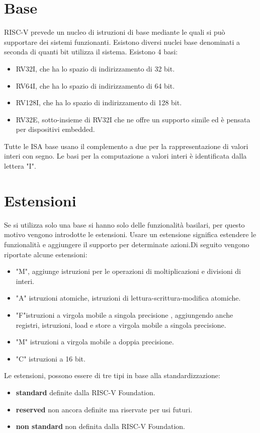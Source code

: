 \documentclass[12pt,a4paper]{report}
\begin{document}
\section{Base}
RISC-V prevede un nucleo di istruzioni di base mediante le quali si può supportare dei sistemi funzionanti. Esistono diversi nuclei base denominati a seconda di quanti bit utilizza il sistema.  Esistono 4 basi:
\begin{itemize}
	\item RV32I, che ha lo spazio di indirizzamento di 32 bit.  
	\item RV64I, che ha lo spazio di indirizzamento di 64 bit.
	\item RV128I, che ha lo spazio di indirizzamento di 128 bit.
	\item RV32E,  sotto-insieme di RV32I che ne offre un supporto simile ed è pensata  per dispositivi embedded.
\end{itemize}
Tutte le ISA base usano il complemento a due per la rappresentazione di valori interi con segno.  Le basi per la computazione a valori interi è identificata dalla lettera "I". 

\section{Estensioni}
Se si utilizza solo una base si hanno solo delle funzionalità basilari, per questo motivo vengono introdotte le estensioni. Usare un estensione significa estendere le funzionalità e aggiungere il supporto per determinate azioni.Di seguito vengono riportate alcune estensioni:
\begin{itemize}
		\item "M", aggiunge istruzioni per le operazioni di moltiplicazioni e divisioni di interi.
		\item "A" istruzioni atomiche,  istruzioni di lettura-scrittura-modifica atomiche. %
		\item "F"istruzioni a virgola mobile a singola precisione , aggiungendo anche registri, istruzioni, load e store a virgola mobile a singola precisione.
		\item "M" istruzioni a virgola mobile a doppia precisione.
		\item "C" istruzioni a 16 bit.
\end{itemize}

Le estensioni, possono essere di tre tipi in base alla standardizzazione:
\begin{itemize}
	\item \textbf{standard} definite dalla RISC-V Foundation.
	\item \textbf{reserved} non ancora definite ma riservate per usi futuri.
	\item \textbf{non standard} non definita dalla RISC-V Foundation.
\end{itemize}
\end{document}
